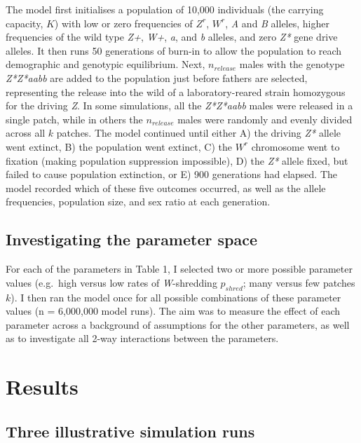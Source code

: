 \documentclass[]{rsos}%
\begin{document}
The model first initialises a population of 10,000 individuals (the
carrying capacity, \(K\)) with low or zero frequencies of \(Z^r\),
\(W^r\), \emph{A} and \emph{B} alleles, higher frequencies of the wild
type \emph{Z+}, \emph{W+}, \emph{a}, and \emph{b} alleles, and zero
\emph{Z*} gene drive alleles. It then runs 50 generations of burn-in to
allow the population to reach demographic and genotypic equilibrium.
Next, \(n_{release}\) males with the genotype \emph{Z*Z*aabb} are added
to the population just before fathers are selected, representing the
release into the wild of a laboratory-reared strain homozygous for the
driving \emph{Z}. In some simulations, all the \emph{Z*Z*aabb} males
were released in a single patch, while in others the \(n_{release}\)
males were randomly and evenly divided across all \(k\) patches. The
model continued until either A) the driving \emph{Z*} allele went
extinct, B) the population went extinct, C) the \(W^r\) chromosome went
to fixation (making population suppression impossible), D) the \emph{Z*}
allele fixed, but failed to cause population extinction, or E) 900
generations had elapsed. The model recorded which of these five outcomes
occurred, as well as the allele frequencies, population size, and sex
ratio at each generation.

\hypertarget{investigating-the-parameter-space}{%
\subsection{Investigating the parameter
space}\label{investigating-the-parameter-space}}

For each of the parameters in Table 1, I selected two or more possible
parameter values (e.g.~high versus low rates of \emph{W}-shredding
\(p_{shred}\); many versus few patches \(k\)). I then ran the model once
for all possible combinations of these parameter values (n = 6,000,000
model runs). The aim was to measure the effect of each parameter across
a background of assumptions for the other parameters, as well as to
investigate all 2-way interactions between the parameters.

\hypertarget{results}{%
\section{Results}\label{results}}

\hypertarget{three-illustrative-simulation-runs}{%
\subsection{Three illustrative simulation
runs}\label{three-illustrative-simulation-runs}}
\end{document}

